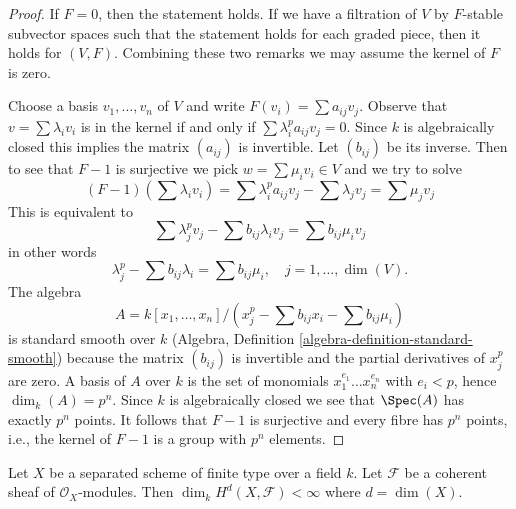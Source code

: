\begin{proof}
If $F = 0$, then the statement holds. If we have a filtration of $V$ by
$F$-stable subvector spaces such that the statement holds for each
graded piece, then it holds for $(V, F)$. Combining these two remarks
we may assume the kernel of $F$ is zero.

\medskip\noindent
Choose a basis $v_1, \ldots, v_n$ of $V$ and write
$F(v_i) = \sum a_{ij} v_j$. Observe that $v = \sum \lambda_i v_i$
is in the kernel if and only if $\sum \lambda_i^p a_{ij} v_j = 0$.
Since $k$ is algebraically closed this implies the matrix $(a_{ij})$
is invertible. Let $(b_{ij})$ be its inverse. Then to see that $F - 1$
is surjective we pick $w = \sum \mu_i v_i \in V$ and we try to solve
$$
(F - 1)(\sum \lambda_iv_i) =
\sum \lambda_i^p a_{ij} v_j - \sum \lambda_j v_j = \sum \mu_j v_j
$$
This is equivalent to
$$
\sum \lambda_j^p v_j - \sum b_{ij} \lambda_i v_j = \sum b_{ij} \mu_i v_j
$$
in other words
$$
\lambda_j^p - \sum b_{ij} \lambda_i = \sum b_{ij} \mu_i,
\quad j = 1, \ldots, \dim(V).
$$
The algebra
$$
A = k[x_1, \ldots, x_n]/
(x_j^p - \sum b_{ij} x_i - \sum b_{ij} \mu_i)
$$
is standard smooth over $k$
(Algebra, Definition \ref{algebra-definition-standard-smooth})
because the matrix $(b_{ij})$ is invertible and the partial derivatives
of $x_j^p$ are zero. A basis of $A$ over $k$ is the set of monomials
$x_1^{e_1} \ldots x_n^{e_n}$ with $e_i < p$, hence $\dim_k(A) = p^n$.
Since $k$ is algebraically closed we see that $\Spec(A)$ has exactly
$p^n$ points. It follows that $F - 1$ is surjective and every fibre
has $p^n$ points, i.e., the kernel of $F - 1$ is a group with $p^n$ elements.
\end{proof}

\begin{lemma}
\label{lemma-top-cohomology-coherent}
Let $X$ be a separated scheme of finite type over a field $k$.
Let $\mathcal{F}$ be a coherent sheaf of $\mathcal{O}_X$-modules.
Then $\dim_k H^d(X, \mathcal{F}) < \infty$ where $d = \dim(X)$.
\end{lemma}


